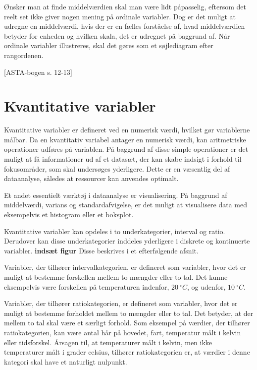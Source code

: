 \documentclass[
]{book}
\theoremstyle{definition}
\theoremstyle{definition}
\theoremstyle{definition}
\theoremstyle{remark}
\begin{document}
Ønsker man at finde middelværdien skal man være lidt påpasselig, eftersom det reelt set ikke giver nogen mening på ordinale variabler. Dog er det muligt at udregne en middelværdi, hvis der er en fælles forståelse af, hvad middelværdien betyder for enheden og hvilken skala, det er udregnet på baggrund af. Når ordinale variabler illustreres, skal det gøres som et søjlediagram efter rangordenen.

{[}ASTA-bogen s. 12-13{]}

\hypertarget{kvantitative-variabler}{%
\section{Kvantitative variabler}\label{kvantitative-variabler}}

Kvantitative variabler er defineret ved en numerisk værdi, hvilket gør variablerne målbar. Da en kvantitativ variabel antager en numerisk værdi, kan aritmetriske operationer udføres på variablen. På baggrund af disse simple operationer er det muligt at få informationer ud af et datasæt, der kan skabe indsigt i forhold til fokusområder, som skal undersøges yderligere. Dette er en væsentlig del af dataanalyse, således at ressourcer kan anvendes optimalt.

Et andet essentielt værktøj i dataanalyse er visualisering. På baggrund af middelværdi, varians og standardafvigelse, er det muligt at visualisere data med eksempelvis et histogram eller et boksplot.

Kvantitative variabler kan opdeles i to underkategorier, interval og ratio. Derudover kan disse underkategorier inddeles yderligere i diskrete og kontinuerte variabler. \textbf{indsæt figur} Disse beskrives i et efterfølgende afsnit.

Variabler, der tilhører intervalkategorien, er defineret som variabler, hvor det er muligt at bestemme forskellen mellem to mængder eller to tal. Det kunne eksempelvis være forskellen på temperaturen indenfor, \(20 ~^\circ C\), og udenfor, \(10 ~^\circ C\).

Variabler, der tilhører ratiokategorien, er defineret som variabler, hvor det er muligt at bestemme forholdet mellem to mængder eller to tal. Det betyder, at der mellem to tal skal være et særligt forhold. Som eksempel på værdier, der tilhører ratiokategorien, kan være antal hår på hovedet, fart, temperatur målt i kelvin eller tidsforskel. Årsagen til, at temperaturer målt i kelvin, men ikke temperaturer målt i grader celsius, tilhører ratiokategorien er, at værdier i denne kategori skal have et naturligt nulpunkt.
\end{document}
